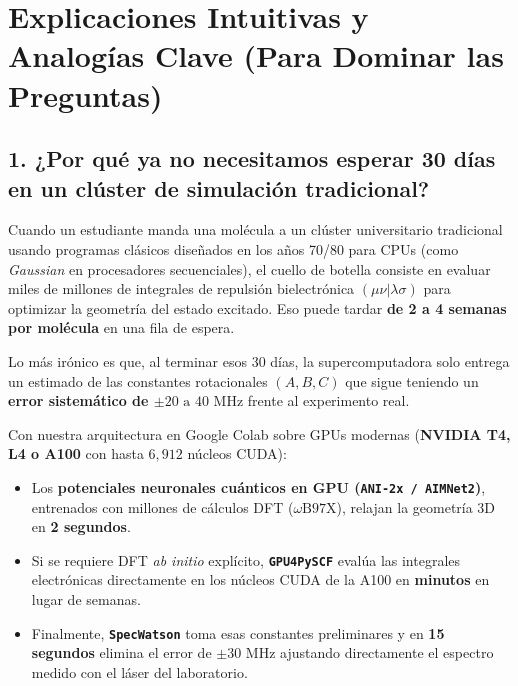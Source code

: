 \documentclass[11pt,letterpaper]{article}
\begin{document}
\section{Explicaciones Intuitivas y Analogías Clave (Para Dominar las Preguntas)}

\subsection{1. ¿Por qué ya no necesitamos esperar 30 días en un clúster de simulación tradicional?}
Cuando un estudiante manda una molécula a un clúster universitario tradicional usando programas clásicos diseñados en los años 70/80 para CPUs (como \textit{Gaussian} en procesadores secuenciales), el cuello de botella consiste en evaluar miles de millones de integrales de repulsión bielectrónica $(\mu\nu|\lambda\sigma)$ para optimizar la geometría del estado excitado. Eso puede tardar \textbf{de 2 a 4 semanas por molécula} en una fila de espera.

Lo más irónico es que, al terminar esos 30 días, la supercomputadora solo entrega un estimado de las constantes rotacionales $(A, B, C)$ que sigue teniendo un \textbf{error sistemático de $\pm 20\text{ a }40\text{ MHz}$} frente al experimento real.

Con nuestra arquitectura en Google Colab sobre GPUs modernas (\textbf{NVIDIA T4, L4 o A100} con hasta $6,912$ núcleos CUDA):
\begin{itemize}[leftmargin=1.5em,itemsep=2pt]
    \item Los \textbf{potenciales neuronales cuánticos en GPU (\texttt{ANI-2x / AIMNet2})}, entrenados con millones de cálculos DFT ($\omega\text{B97X}$), relajan la geometría 3D en \textbf{2 segundos}.
    \item Si se requiere DFT \textit{ab initio} explícito, \textbf{\texttt{GPU4PySCF}} evalúa las integrales electrónicas directamente en los núcleos CUDA de la A100 en \textbf{minutos} en lugar de semanas.
    \item Finalmente, \textbf{\texttt{SpecWatson}} toma esas constantes preliminares y en \textbf{15 segundos} elimina el error de $\pm 30\text{ MHz}$ ajustando directamente el espectro medido con el láser del laboratorio.
\end{itemize}
\end{document}
